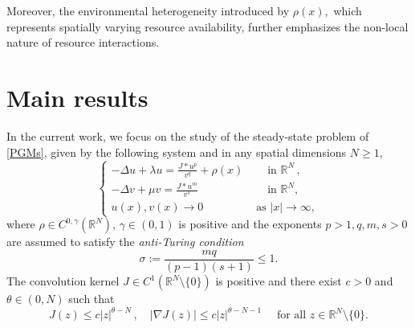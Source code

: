 \documentclass[leqno,12pt]{article}
\newcommand{\R}{\mathbb R}
\numberwithin{equation}{section}
\begin{document}
Moreover, the environmental heterogeneity introduced by $\rho(x),$ which represents spatially varying resource availability, further emphasizes the non-local nature of resource interactions. %


\section{Main results}
In the current work, we focus on the study of the steady-state problem of \eqref{PGMs}, given by the following system and in any spatial dimensions $N\geq 1$,
\begin{equation}\label{GMs}
\begin{cases}
\displaystyle   -\Delta u+\lambda u=\frac{J * u^p}{v^q}+\rho(x) &\quad\mbox{ in }\R^N\, , \\[0.1in]
\displaystyle   -\Delta v+\mu v=\frac{J * u^m}{v^s} &\quad\mbox{ in }\R^N,\\[0.1in]
u(x), v(x)\to 0 &\mbox{ as }|x|\to \infty,
\end{cases}
\end{equation}
where $\rho\in C^{0, \gamma}(\R^N)$, $\gamma\in (0,1)$ is positive  and the exponents $p>1, q,m,s>0$ are assumed to satisfy the {\it anti-Turing condition}
\[
\sigma:=\frac{mq}{(p-1)(s+1)}\leq 1.
\]
The convolution kernel  $J\in C^1(\R^N\setminus\{0\})$ is positive and there exist $c>0$ and $\theta\in (0, N)$ such that
\begin{equation}\label{J}
J(z)\leq c|z|^{\theta-N}\,,\quad |\nabla J(z)|\leq c|z|^{\theta-N-1} \quad\mbox{ for all }z\in \R^N\setminus\{0\}.
\end{equation}
\end{document}
